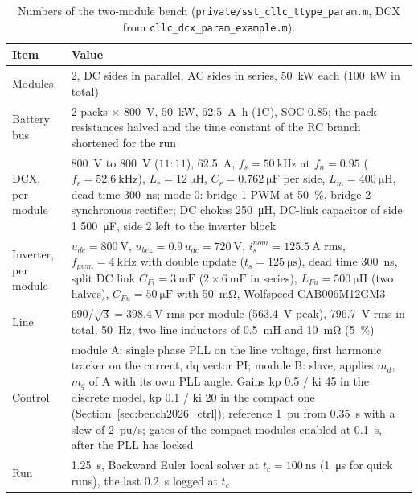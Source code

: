 \documentclass[12pt,a4paper]{scrartcl}
\begin{document}
\begin{onehalfspace}
\begin{table}[H]
	\centering
	\captionsetup{width=0.9\textwidth, font=small}
	\caption[Numbers of the two-module bench.]{Numbers of the two-module bench (\texttt{private/sst\_cllc\_ttype\_param.m}, DCX from \texttt{cllc\_dcx\_param\_example.m}).}
	\label{tab:bench2026}
	\small
	\begin{tabularx}{0.97\textwidth}{@{} >{\raggedright\arraybackslash}p{} X @{}}
		\toprule
		\textbf{Item} & \textbf{Value} \\
		\midrule
		Modules & 2, DC sides in parallel, AC sides in series, \SI{50}{\kilo\watt} each (\SI{100}{\kilo\watt} in total) \\
		Battery bus & 2 packs $\times$ \SI{800}{\volt}, \SI{50}{\kilo\watt}, \SI{62.5}{\ampere\hour} (1C), SOC 0.85; the pack resistances halved and the time constant of the RC branch shortened for the run \\
		DCX, per module & \SI{800}{\volt} to \SI{800}{\volt} ($11:11$), \SI{62.5}{\ampere}, $f_s = \SI{50}{\kilo\hertz}$ at $f_n = 0.95$ ($f_r = \SI{52.6}{\kilo\hertz}$), $L_r = \SI{12}{\micro\henry}$, $C_r = \SI{0.762}{\micro\farad}$ per side, $L_m = \SI{400}{\micro\henry}$, dead time \SI{300}{\nano\second}; mode 0: bridge 1 PWM at \SI{50}{\percent}, bridge 2 synchronous rectifier; DC chokes \SI{250}{\micro\henry}, DC-link capacitor of side 1 \SI{500}{\micro\farad}, side 2 left to the inverter block \\
		Inverter, per module & $u_{dc} = \SI{800}{\volt}$, $u_{bez} = 0.9\,u_{dc} = \SI{720}{\volt}$, $i_{s}^{nom} = \SI{125.5}{\ampere}$ rms, $f_{pwm} = \SI{4}{\kilo\hertz}$ with double update ($t_s = \SI{125}{\micro\second}$), dead time \SI{300}{\nano\second}, split DC link $C_{Fi} = \SI{3}{\milli\farad}$ ($2 \times \SI{6}{\milli\farad}$ in series), $L_{Fu} = \SI{500}{\micro\henry}$ (two halves), $C_{Fu} = \SI{50}{\micro\farad}$ with \SI{50}{\milli\ohm}, Wolfspeed CAB006M12GM3 \\
		Line & $690/\sqrt{3} = \SI{398.4}{\volt}$ rms per module (\SI{563.4}{\volt} peak), \SI{796.7}{\volt} rms in total, \SI{50}{\hertz}, two line inductors of \SI{0.5}{\milli\henry} and \SI{10}{\milli\ohm} (\SI{5}{\percent}) \\
		Control & module A: single phase PLL on the line voltage, first harmonic tracker on the current, dq vector PI; module B: slave, applies $m_d$, $m_q$ of A with its own PLL angle. Gains kp \num{0.5} / ki \num{45} in the discrete model, kp \num{0.1} / ki \num{20} in the compact one (Section~\ref{sec:bench2026_ctrl}); reference \SI{1}{pu} from \SI{0.35}{\second} with a slew of \SI{2}{pu/s}; gates of the compact modules enabled at \SI{0.1}{\second}, after the PLL has locked \\
		Run & \SI{1.25}{\second}, Backward Euler local solver at $t_c = \SI{100}{\nano\second}$ (\SI{1}{\micro\second} for quick runs), the last \SI{0.2}{\second} logged at $t_c$ \\
		\bottomrule
	\end{tabularx}
\end{table}


\end{onehalfspace}
\end{document}
